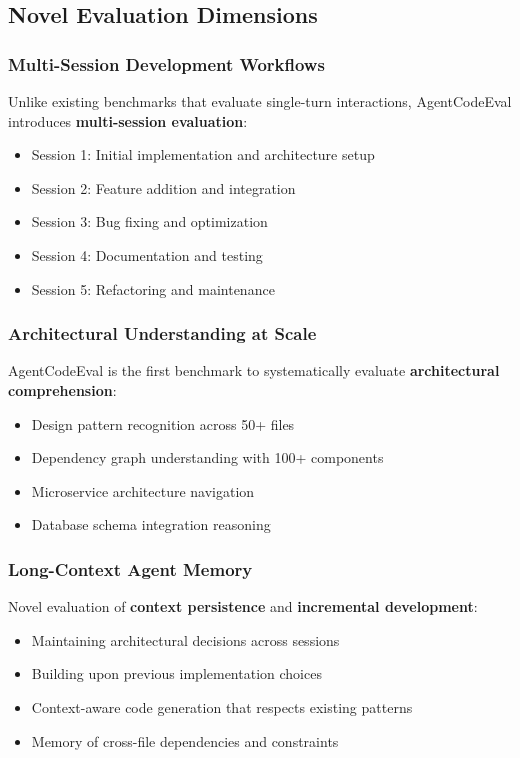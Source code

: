 \documentclass{article}
\begin{document}
\subsection{Novel Evaluation Dimensions}

\subsubsection{Multi-Session Development Workflows}
Unlike existing benchmarks that evaluate single-turn interactions, AgentCodeEval introduces \textbf{multi-session evaluation}:
\begin{itemize}
    \item Session 1: Initial implementation and architecture setup
    \item Session 2: Feature addition and integration
    \item Session 3: Bug fixing and optimization
    \item Session 4: Documentation and testing
    \item Session 5: Refactoring and maintenance
\end{itemize}

\subsubsection{Architectural Understanding at Scale}
AgentCodeEval is the first benchmark to systematically evaluate \textbf{architectural comprehension}:
\begin{itemize}
    \item Design pattern recognition across 50+ files
    \item Dependency graph understanding with 100+ components
    \item Microservice architecture navigation
    \item Database schema integration reasoning
\end{itemize}

\subsubsection{Long-Context Agent Memory}
Novel evaluation of \textbf{context persistence} and \textbf{incremental development}:
\begin{itemize}
    \item Maintaining architectural decisions across sessions
    \item Building upon previous implementation choices
    \item Context-aware code generation that respects existing patterns
    \item Memory of cross-file dependencies and constraints
\end{itemize}
\end{document}
